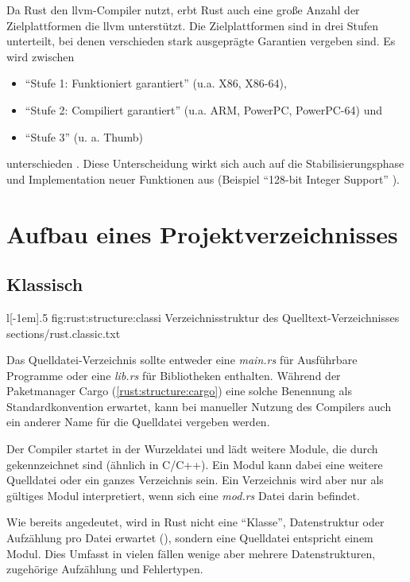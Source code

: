 Da Rust den \gls{llvm}-Compiler nutzt, erbt Rust auch eine große Anzahl der Zielplattformen die \gls{llvm} unterstützt.
Die Zielplattformen sind in drei Stufen unterteilt, bei denen verschieden stark ausgeprägte Garantien vergeben sind. Es wird zwischen
\begin{itemize}
	\item \enquote{Stufe 1: Funktioniert garantiert} (u.a. X86, X86-64),
	\item \enquote{Stufe 2: Compiliert garantiert} (u.a. ARM, PowerPC, PowerPC-64) und
	\item \enquote{Stufe 3} (u. a. Thumb)
\end{itemize}
unterschieden \cite{rust:platform_support}.
Diese Unterscheidung wirkt sich auch auf die Stabilisierungsphase und Implementation neuer Funktionen aus (Beispiel \enquote{128-bit Integer Support} \cite{rust:github:128bit_integer}).

\section{Aufbau eines Projektverzeichnisses}

\subsection{Klassisch}
\label{rust:structure:classic}
\begin{wrapfigure}{l}[-1em]{.5\textwidth}
	\rustcinclude
		{fig:rust:structure:classi}
		{Verzeichnisstruktur des Quelltext-Verzeichnisses}
		{sections/rust.classic.txt}
\end{wrapfigure}

Das Quelldatei-Verzeichnis sollte entweder eine \textit{main.rs} für Ausführbare Programme oder eine \textit{lib.rs} für Bibliotheken enthalten.
Während der Paketmanager Cargo (\autoref{rust:structure:cargo}) eine solche Benennung als Standardkonvention erwartet, kann bei manueller Nutzung des Compilers auch ein anderer Name für die Quelldatei vergeben werden.

Der Compiler startet in der Wurzeldatei und lädt weitere Module, die durch  gekennzeichnet sind (ähnlich  in C/C++).
Ein Modul kann dabei eine weitere Quelldatei oder ein ganzes Verzeichnis sein.
Ein Verzeichnis wird aber nur als gültiges Modul interpretiert, wenn sich eine \textit{mod.rs} Datei darin befindet.

Wie bereits angedeutet, wird in Rust nicht eine \enquote{Klasse}, Datenstruktur oder Aufzählung pro Datei erwartet (), sondern eine Quelldatei entspricht einem Modul.
Dies Umfasst in vielen fällen wenige aber mehrere Datenstrukturen, zugehörige Aufzählung und Fehlertypen.


